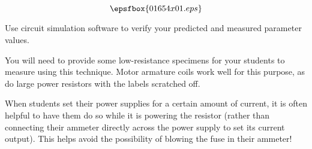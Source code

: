 

$$\epsfbox{01654x01.eps}$$

\vfil \eject






Use circuit simulation software to verify your predicted and measured parameter values.







You will need to provide some low-resistance specimens for your students to measure using this technique.  Motor armature coils work well for this purpose, as do large power resistors with the labels scratched off.

\vskip 10pt

When students set their power supplies for a certain amount of current, it is often helpful to have them do so while it is powering the resistor (rather than connecting their ammeter directly across the power supply to set its current output).  This helps avoid the possibility of blowing the fuse in their ammeter!




